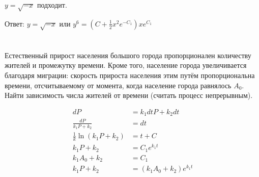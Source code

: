 $y = \sqrt{-x}$ подходит.

Ответ: $y=\sqrt{-x}$ или $y^6 = \left(C + \frac{1}{2}x^2 e^{-C_1} \right) xe^{C_1}$

\section{}


\section{}

Естественный прирост населения большого города пропорционален количеству жителей и промежутку  времени. Кроме того, население города увеличивается благодаря миграции: скорость прироста населения этим путём пропорциональна времени, отсчитываемому от момента, когда население города равнялось $A_0$. Найти зависимость числа жителей от времени (считать процесс непрерывным).

\begin{align*}
    dP                       & = k_1 dt P + k_2 dt       \\
    \frac{dP}{k_1P+k_2}      & = dt                      \\
    \frac{1}{k}\ln(k_1P+k_2) & = t + C                   \\
    k_1 P + k_2              & = C_1e^{k_1t}             \\
    k_1 A_0 + k_2            & = C_1                     \\
    k_1P + k_2               & = (k_1 A_0 + k_2)e^{k_1t}
\end{align*}


